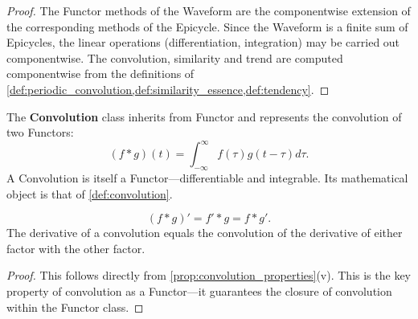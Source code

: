 \begin{proof}
The Functor methods of the Waveform are the componentwise extension of the corresponding methods of the Epicycle. Since the Waveform is a finite sum of Epicycles, the linear operations (differentiation, integration) may be carried out componentwise. The convolution, similarity and trend are computed componentwise from the definitions of \cref{def:periodic_convolution,def:similarity_essence,def:tendency}.
\end{proof}

\begin{definition}\label{def:convolution_class}
The \textbf{Convolution} class inherits from Functor and represents the convolution of two Functors:
\[
(f * g)(t) = \int_{-\infty}^{\infty} f(\tau) g(t - \tau) d\tau.
\]
A Convolution is itself a Functor---differentiable and integrable. Its mathematical object is that of \cref{def:convolution}.
\end{definition}

\begin{property}\label{prop:convolution_class_derivative}
\[
(f * g)' = f' * g = f * g'.
\]
The derivative of a convolution equals the convolution of the derivative of either factor with the other factor.
\end{property}

\begin{proof}
This follows directly from \cref{prop:convolution_properties}(v). This is the key property of convolution as a Functor---it guarantees the closure of convolution within the Functor class.
\end{proof}

\newpage

